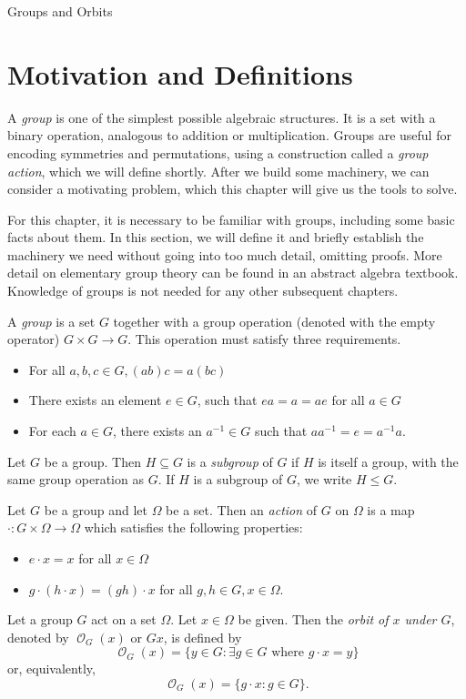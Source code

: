 \documentclass[12pt]{pom_thesis}
\DeclareMathOperator{\orb}{\mathcal{O}}
\begin{document}
\begin{chapter}{Groups and Orbits} \label{chap:groups}
\section{Motivation and Definitions}
A \emph{group} is one of the simplest possible algebraic structures. It is a set with a binary operation, analogous to addition or multiplication. Groups are useful for encoding symmetries and permutations, using a construction called a \emph{group action}, which we will define shortly. After we build some machinery, we can consider a motivating problem, which this chapter will give us the tools to solve.

For this chapter, it is necessary to be familiar with groups, including some basic facts about them. In this section, we will define it and briefly establish the machinery we need without going into too much detail, omitting proofs. More detail on elementary group theory can be found in an abstract algebra textbook. Knowledge of groups is not needed for any other subsequent chapters.

\begin{defn}
A \emph{group} is a set $G$ together with a group operation (denoted with the empty operator) $G \times G \rightarrow G$. This operation must satisfy three requirements.
\begin{itemize}
\item For all $a,b,c \in G, (ab)c = a(bc)$
\item There exists an element $e \in G$, such that $ea=a=ae$ for all $a \in G$
\item For each $a \in G$, there exists an $a^{-1} \in G$ such that $aa^{-1} = e = a^{-1}a$.
\end{itemize} 
\end{defn}
\begin{defn}
Let $G$ be a group. Then $H \subseteq G$ is a \emph{subgroup} of $G$ if $H$ is itself a group, with the same group operation as $G$. If $H$ is a subgroup of $G$, we write $H \leq G$.
\end{defn}
\begin{defn}
Let $G$ be a group and let $\Omega$ be a set. Then an \emph{action} of $G$ on $\Omega$ is a map $\cdot:G \times \Omega \rightarrow \Omega$ which satisfies the following properties:
\begin{itemize}
\item $e \cdot x = x$ for all $x \in \Omega$
\item $g \cdot (h \cdot x) = (gh) \cdot x$ for all $g,h \in G, x \in \Omega$.
\end{itemize} 
\end{defn}
\begin{defn}
Let a group $G$ act on a set $\Omega$. Let $x \in \Omega$ be given. Then the \emph{orbit of $x$ under $G$}, denoted by $\orb_G(x)$ or $Gx$, is defined by
\[
\orb_G(x) = \{ y \in G : \exists g \in G \text{ where } g\cdot x = y\}
\]
or, equivalently,
\[
\orb_G(x) = \{g\cdot x : g \in G\}.
\]
\end{defn}


\end{chapter}
\end{document}
